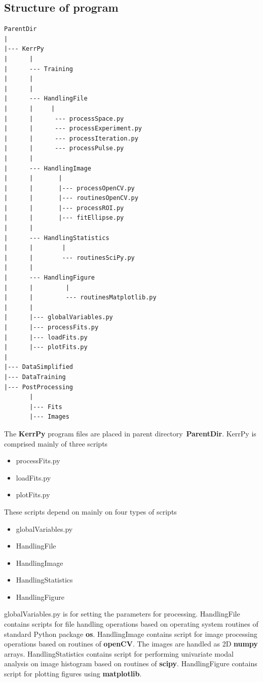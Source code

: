 \documentclass[12pt, twoside, a4paper]{article}
\begin{document}
\subsection{Structure of program}
\begin{verbatim}
ParentDir
|
|--- KerrPy
|      |
|      --- Training
|      |
|      |
|      --- HandlingFile
|      |     |
|      |      --- processSpace.py
|      |      --- processExperiment.py
|      |      --- processIteration.py
|      |      --- processPulse.py
|      |
|      --- HandlingImage
|      |       |
|      |       |--- processOpenCV.py
|      |       |--- routinesOpenCV.py
|      |       |--- processROI.py
|      |       |--- fitEllipse.py
|      |
|      --- HandlingStatistics
|      |        |
|      |        --- routinesSciPy.py
|      |
|      --- HandlingFigure
|      |         |
|      |         --- routinesMatplotlib.py              
|      |
|      |--- globalVariables.py
|      |--- processFits.py
|      |--- loadFits.py
|      |--- plotFits.py      
|
|--- DataSimplified
|--- DataTraining
|--- PostProcessing
       |
       |--- Fits
       |--- Images
\end{verbatim}
%
The \textbf{KerrPy} program files are placed in parent directory~\textbf{ParentDir}. KerrPy is comprised mainly of three scripts
\begin{itemize}
	\item processFits.py
	\item loadFits.py
	\item plotFits.py
\end{itemize}
These scripts depend on mainly on four types of scripts
\begin{itemize}
	\item globalVariables.py 
	\item HandlingFile 
	\item HandlingImage
	\item HandlingStatistics
	\item HandlingFigure
\end{itemize}
globalVariables.py is for setting the parameters for processing. HandlingFile contains scripts for file handling operations based on operating system routines of standard Python package \textbf{os}. HandlingImage contains script for image processing operations based on routines of \textbf{openCV}. The images are handled as 2D \textbf{numpy} arrays. HandlingStatistics contains script for performing univariate modal analysis on image histogram based on routines of \textbf{scipy}. HandlingFigure contains script for plotting figures using \textbf{matplotlib}.
\end{document}

